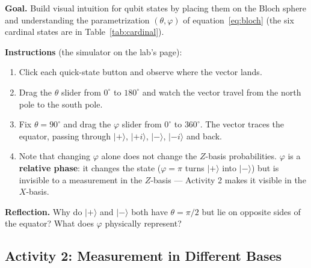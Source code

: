 \documentclass[a4paper,11pt]{article}
\newcommand{\keepspace}[1]{\par\vspace{0pt plus #1}\penalty-300\vspace{0pt plus -#1}}
\providecommand{\ket}[1]{|{#1}\rangle}
\begin{document}
\begin{studentbox}
\textbf{Goal.} Build visual intuition for qubit states by placing them on the Bloch
sphere and understanding the parametrization $(\theta, \varphi)$ of
equation~\eqref{eq:bloch} (the six cardinal states are in Table~\ref{tab:cardinal}).

\medskip
\textbf{Instructions} (the simulator on the lab's page):
\begin{enumerate}
    \item Click each quick-state button and observe where the vector lands.
    \item Drag the $\theta$ slider from $0^\circ$ to $180^\circ$ and watch the vector travel
          from the north pole to the south pole.
    \item Fix $\theta = 90^\circ$ and drag the $\varphi$ slider from $0^\circ$ to $360^\circ$.
          The vector traces the equator, passing through $\ket{+}$, $\ket{+i}$, $\ket{-}$,
          $\ket{-i}$ and back.
    \item Note that changing $\varphi$ alone does not change the $Z$-basis probabilities.
          $\varphi$ is a \textbf{relative phase}: it changes the state ($\varphi = \pi$
          turns $\ket{+}$ into $\ket{-}$) but is invisible to a measurement in the
          $Z$-basis --- Activity 2 makes it visible in the $X$-basis.
\end{enumerate}

\textbf{Reflection.} Why do $\ket{+}$ and $\ket{-}$ both have $\theta = \pi/2$ but lie on
opposite sides of the equator? What does $\varphi$ physically represent?
\end{studentbox}

\keepspace{8\baselineskip}
\subsection{Activity 2: Measurement in Different Bases}
\end{document}
